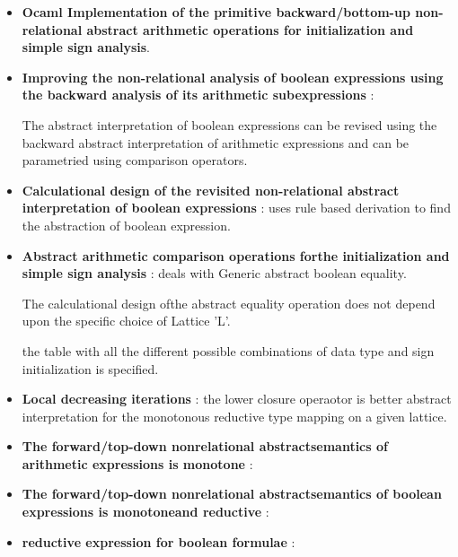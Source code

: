 \begin{itemize}
	\item{\textbf{Ocaml Implementation of the primitive backward/bottom-up non-relational abstract arithmetic operations for initialization and simple sign analysis}.
	}

	\item{\textbf{Improving the non-relational analysis of boolean expressions using the backward analysis of its arithmetic subexpressions} : 

	The abstract interpretation of boolean expressions can be revised using the backward abstract interpretation of arithmetic expressions and can be parametried using comparison operators.
	}

	\item{\textbf{Calculational design of the revisited non-relational abstract interpretation of boolean expressions} : uses rule based derivation to find the abstraction of boolean expression.
	}

	\item{\textbf{Abstract arithmetic comparison operations forthe initialization and simple sign analysis} : deals with Generic abstract boolean equality.

	The calculational design ofthe abstract equality operation does not depend upon the specific choice of Lattice 'L'.

	the table with all the different possible combinations of data type and sign initialization is specified.
	}

	\item{\textbf{Local decreasing iterations} : the lower closure operaotor is better abstract interpretation for the  monotonous reductive type mapping on a given lattice.
	}

	\item{\textbf{The forward/top-down nonrelational abstractsemantics of arithmetic expressions is monotone} : 
	}

	\item{\textbf{The forward/top-down nonrelational abstractsemantics of boolean expressions is monotoneand reductive} :
	}

	\item{\textbf{reductive expression for boolean formulae} :
	}

\end{itemize}